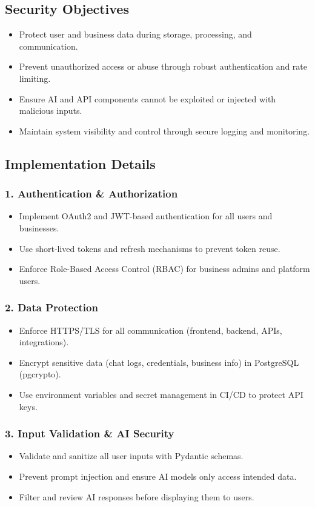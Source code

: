 \documentclass[12pt,a4paper]{article}
\begin{document}
\subsection{Security Objectives}
\begin{itemize}
    \item Protect user and business data during storage, processing, and communication.
    \item Prevent unauthorized access or abuse through robust authentication and rate limiting.
    \item Ensure AI and API components cannot be exploited or injected with malicious inputs.
    \item Maintain system visibility and control through secure logging and monitoring.
\end{itemize}

\subsection{Implementation Details}
\subsubsection{1. Authentication \& Authorization}
\begin{itemize}
    \item Implement OAuth2 and JWT-based authentication for all users and businesses.
    \item Use short-lived tokens and refresh mechanisms to prevent token reuse.
    \item Enforce Role-Based Access Control (RBAC) for business admins and platform users.
\end{itemize}

\subsubsection{2. Data Protection}
\begin{itemize}
    \item Enforce HTTPS/TLS for all communication (frontend, backend, APIs, integrations).
    \item Encrypt sensitive data (chat logs, credentials, business info) in PostgreSQL (pgcrypto).
    \item Use environment variables and secret management in CI/CD to protect API keys.
\end{itemize}

\subsubsection{3. Input Validation \& AI Security}
\begin{itemize}
    \item Validate and sanitize all user inputs with Pydantic schemas.
    \item Prevent prompt injection and ensure AI models only access intended data.
    \item Filter and review AI responses before displaying them to users.
\end{itemize}
\end{document}
